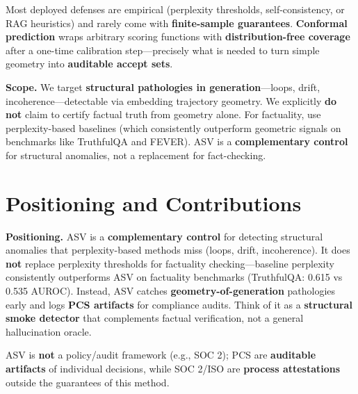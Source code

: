 \documentclass[11pt]{article}
\begin{document}
Most deployed defenses are empirical (perplexity thresholds, self-consistency, or RAG heuristics) and rarely come with \textbf{finite-sample guarantees}. \textbf{Conformal prediction} wraps arbitrary scoring functions with \textbf{distribution-free coverage} after a one-time calibration step---precisely what is needed to turn simple geometry into \textbf{auditable accept sets}.

\textbf{Scope.} We target \textbf{structural pathologies in generation}---loops, drift, incoherence---detectable via embedding trajectory geometry. We explicitly \textbf{do not} claim to certify factual truth from geometry alone. For factuality, use perplexity-based baselines (which consistently outperform geometric signals on benchmarks like TruthfulQA and FEVER). ASV is a \textbf{complementary control} for structural anomalies, not a replacement for fact-checking.

\section{Positioning and Contributions}
\label{sec:contributions}

\textbf{Positioning.} ASV is a \textbf{complementary control} for detecting structural anomalies that perplexity-based methods miss (loops, drift, incoherence). It does \textbf{not} replace perplexity thresholds for factuality checking---baseline perplexity consistently outperforms ASV on factuality benchmarks (TruthfulQA: 0.615 vs 0.535 AUROC). Instead, ASV catches \textbf{geometry-of-generation} pathologies early and logs \textbf{PCS artifacts} for compliance audits. Think of it as a \textbf{structural smoke detector} that complements factual verification, not a general hallucination oracle.

ASV is \textbf{not} a policy/audit framework (e.g., SOC 2); PCS are \textbf{auditable artifacts} of individual decisions, while SOC 2/ISO are \textbf{process attestations} outside the guarantees of this method.
\end{document}
